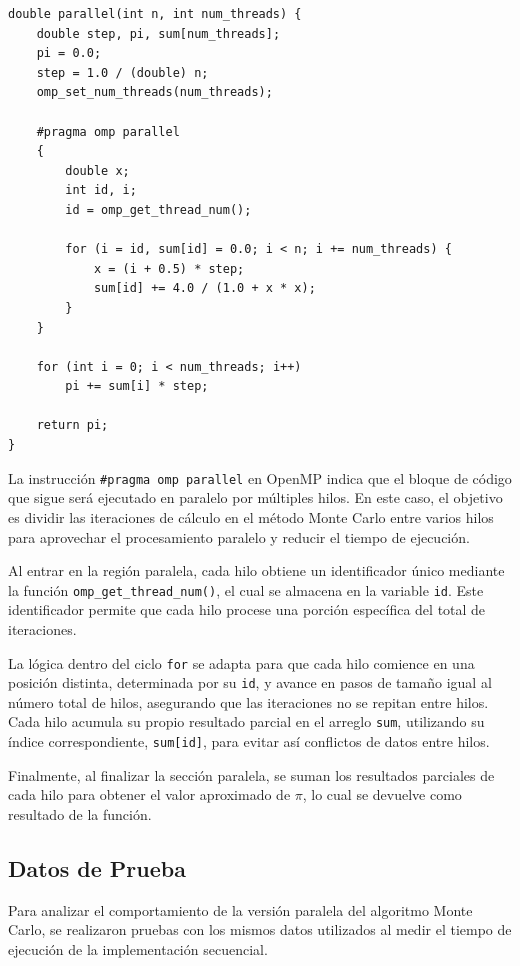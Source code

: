 \documentclass[a4paper, 10pt, onecolumn]{IEEEtran}
\begin{document}
\begin{lstlisting}[caption={Implementación Paralela de Monte Carlo en C++}, label={lst:parallel}]
double parallel(int n, int num_threads) {
	double step, pi, sum[num_threads];
	pi = 0.0;
	step = 1.0 / (double) n;
	omp_set_num_threads(num_threads);
	
	#pragma omp parallel
	{
		double x;
		int id, i;
		id = omp_get_thread_num();
		
		for (i = id, sum[id] = 0.0; i < n; i += num_threads) {
			x = (i + 0.5) * step;
			sum[id] += 4.0 / (1.0 + x * x);
		}
	}
	
	for (int i = 0; i < num_threads; i++)
		pi += sum[i] * step;

	return pi;
}
\end{lstlisting}

La instrucción \texttt{\#pragma omp parallel} en OpenMP indica que el bloque de código que sigue será ejecutado en paralelo por múltiples hilos. En este caso, el objetivo es dividir las iteraciones de cálculo en el método Monte Carlo entre varios hilos para aprovechar el procesamiento paralelo y reducir el tiempo de ejecución.

Al entrar en la región paralela, cada hilo obtiene un identificador único mediante la función \texttt{omp\_get\_thread\_num()}, el cual se almacena en la variable \texttt{id}. Este identificador permite que cada hilo procese una porción específica del total de iteraciones.

La lógica dentro del ciclo \texttt{for} se adapta para que cada hilo comience en una posición distinta, determinada por su \texttt{id}, y avance en pasos de tamaño igual al número total de hilos, asegurando que las iteraciones no se repitan entre hilos. Cada hilo acumula su propio resultado parcial en el arreglo \texttt{sum}, utilizando su índice correspondiente, \texttt{sum[id]}, para evitar así conflictos de datos entre hilos.

Finalmente, al finalizar la sección paralela, se suman los resultados parciales de cada hilo para obtener el valor aproximado de $\pi$, lo cual se devuelve como resultado de la función.

\subsection{Datos de Prueba}
Para analizar el comportamiento de la versión paralela del algoritmo Monte Carlo, se realizaron pruebas con los mismos datos utilizados al medir el tiempo de ejecución de la implementación secuencial.
\end{document}
